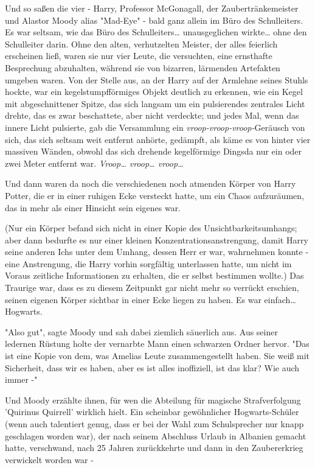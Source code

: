 {Und so saßen die vier - Harry, Professor McGonagall, der Zaubertränkemeister und Alastor Moody alias "Mad-Eye" - bald ganz allein im Büro des Schulleiters. Es war seltsam, wie das Büro des Schulleiters… unausgeglichen wirkte… ohne den Schulleiter darin. Ohne den alten, verhutzelten Meister, der alles feierlich erscheinen ließ, waren sie nur vier Leute, die versuchten, eine ernsthafte Besprechung abzuhalten, während sie von bizarren, lärmenden Artefakten umgeben waren. Von der Stelle aus, an der Harry auf der Armlehne seines Stuhls hockte, war ein kegelstumpfförmiges Objekt deutlich zu erkennen, wie ein Kegel mit abgeschnittener Spitze, das sich langsam um ein pulsierendes zentrales Licht drehte, das es zwar beschattete, aber nicht verdeckte; und jedes Mal, wenn das innere Licht pulsierte, gab die Versammlung ein \emph{vroop-vroop-vroop-}Geräusch von sich, das sich seltsam weit entfernt anhörte, gedämpft, als käme es von hinter vier massiven Wänden, obwohl das sich drehende kegelförmige Dingsda nur ein oder zwei Meter entfernt war. \emph{Vroop… vroop… vroop…}

Und dann waren da noch die verschiedenen noch atmenden Körper von Harry Potter, die er in einer ruhigen Ecke versteckt hatte, um ein Chaos aufzuräumen, das in mehr als einer Hinsicht sein eigenes war.

(Nur ein Körper befand sich nicht in einer Kopie des Unsichtbarkeitsumhangs; aber dann bedurfte es nur einer kleinen Konzentrationsanstrengung, damit Harry seine anderen Ichs unter dem Umhang, dessen Herr er war, wahrnehmen konnte - eine Anstrengung, die Harry vorhin sorgfältig unterlassen hatte, um nicht im Voraus zeitliche Informationen zu erhalten, die er selbst bestimmen wollte.) Das Traurige war, dass es zu diesem Zeitpunkt gar nicht mehr so verrückt erschien, seinen eigenen Körper sichtbar in einer Ecke liegen zu haben. Es war einfach… Hogwarts.

"Also gut", sagte Moody und sah dabei ziemlich säuerlich aus. Aus seiner ledernen Rüstung holte der vernarbte Mann einen schwarzen Ordner hervor. "Das ist eine Kopie von dem, was Amelias Leute zusammengestellt haben. Sie weiß mit Sicherheit, dass wir es haben, aber es ist alles inoffiziell, ist das klar? Wie auch immer -"

Und Moody erzählte ihnen, für wen die Abteilung für magische Strafverfolgung 'Quirinus Quirrell' wirklich hielt. Ein scheinbar gewöhnlicher Hogwarts-Schüler (wenn auch talentiert genug, dass er bei der Wahl zum Schulsprecher nur knapp geschlagen worden war), der nach seinem Abschluss Urlaub in Albanien gemacht hatte, verschwand, nach 25 Jahren zurückkehrte und dann in den Zaubererkrieg verwickelt worden war -

}
